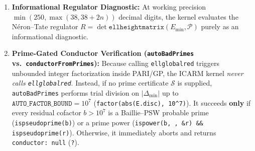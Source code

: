 \documentclass[10pt,a4paper]{article}
\theoremstyle{plain}
\theoremstyle{definition}
\theoremstyle{remark}
\begin{document}
\begin{enumerate}[leftmargin=2em]
\begin{equation}
    \end{equation}
    the kernel iterates over good auxiliary primes $p < 10^6$ ($p \nmid 6\Delta_{\min}$) for which $f(x) \bmod p$ has $k \ge 1$ roots $\theta_1, \dots, \theta_k \in \mathbb{F}_p$. At each such prime, it evaluates the group homomorphism
    \begin{equation}\label{eq:quad_char_map}
    \varepsilon_p: F(\mathbb{Q})/2F(\mathbb{Q}) \longrightarrow (\mathbb{Z}/2\mathbb{Z})^{\min(k,2)}, \qquad \varepsilon_p(P)_j = \frac{1 - \left(\frac{a_j}{p}\right)}{2} \in \mathbb{F}_2,
    \end{equation}
    where for $P = (u/w^2, v/w^3) \in F(\mathbb{Q})$ in lowest terms, $a_j = (u - \theta_j w^2) \bmod p$ if $u \not\equiv \theta_j w^2 \pmod p$, and $a_j = f'(\theta_j) = (3\theta_j^2 - 27c_4) \bmod p$ when $u \equiv \theta_j w^2 \pmod p$. Stacking the $\varepsilon_p$-vectors of the even-order generators of $F(\mathbb{Q})_{\text{tors}}$ into a binary matrix $M_{\text{tors}}$ and those of the $n$ candidate points into $M_{\text{pts}}$, the kernel certifies that $P_1, \dots, P_n$ are $\mathbb{Z}$-linearly independent in $E(\mathbb{Q})/E(\mathbb{Q})_{\text{tors}}$ if and only if
    \begin{equation}\label{eq:f2_rank_cert}
    \mathrm{rank}_{\mathbb{F}_2}\!\begin{pmatrix} M_{\text{tors}} \\ M_{\text{pts}} \end{pmatrix} - \mathrm{rank}_{\mathbb{F}_2}(M_{\text{tors}}) = n.
    \end{equation}
    If a kernel combination $Q + \tau \in 2F(\mathbb{Q})$ is divisible by $2$ in $F(\mathbb{Q})$ (verified algebraically via \texttt{nfroots} on the degree-$4$ doubling polynomial in \texttt{erk\_half2}), the kernel replaces the largest-height point in the dependency with its half-point $R$ (up to $40$ halvings).
    \item \textbf{Informational Regulator Diagnostic:} At working precision $\min(250, \max(38, 38+2n))$ decimal digits, the kernel evaluates the N\'{e}ron--Tate regulator $R = \det \mathtt{ellheightmatrix}(E_{\min}, \mathcal{P})$ purely as an informational diagnostic.
    \item \textbf{Prime-Gated Conductor Verification (\texttt{autoBadPrimes} vs.\ \texttt{conductorFromPrimes}):} Because calling \texttt{ellglobalred} triggers unbounded integer factorization inside PARI/GP, the ICARM kernel \emph{never calls \texttt{ellglobalred}}. Instead, if no prime certificate $\mathcal{S}$ is supplied, \texttt{autoBadPrimes} performs trial division on $|\Delta_{\min}|$ up to $\mathtt{AUTO\_FACTOR\_BOUND} = 10^7$ (\texttt{factor(abs(E.disc), 10\^{}7)}). It succeeds \textbf{only} if every residual cofactor $b > 10^7$ is a Baillie--PSW probable prime (\texttt{ispseudoprime(b)}) or a prime power (\texttt{ispower(b, , \&r) \&\& ispseudoprime(r)}). Otherwise, it immediately aborts and returns \texttt{conductor:\ null} (\texttt{?}).
\end{enumerate}
\end{document}
